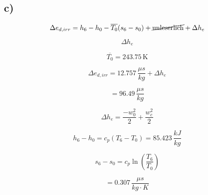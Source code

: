 

\subsection*{c)}

\[
\Delta e_{d,irr} = h_6 - h_0 - \overline{T_0} (s_6 - s_0) + \cancel{\text{unleserlich}} + \Delta h_e
\]

\[
\Delta h_e
\]

\[
\overline{T_0} = 243.75 \, \text{K}
\]

\[
\Delta e_{d,irr} = 12.757 \, \frac{\mu s}{kg} + \Delta h_e
\]

\[
= 96.49 \, \frac{\mu s}{kg}
\]

\[
\Delta h_e = \frac{-w_0^2}{2} + \frac{w_c^2}{2}
\]

\[
h_6 - h_0 = c_p (T_6 - T_0) = 85.423 \, \frac{kJ}{kg}
\]

\[
s_6 - s_0 = c_p \ln \left( \frac{T_6}{T_0} \right)
\]

\[
= 0.307 \, \frac{\mu s}{kg \cdot K}
\]